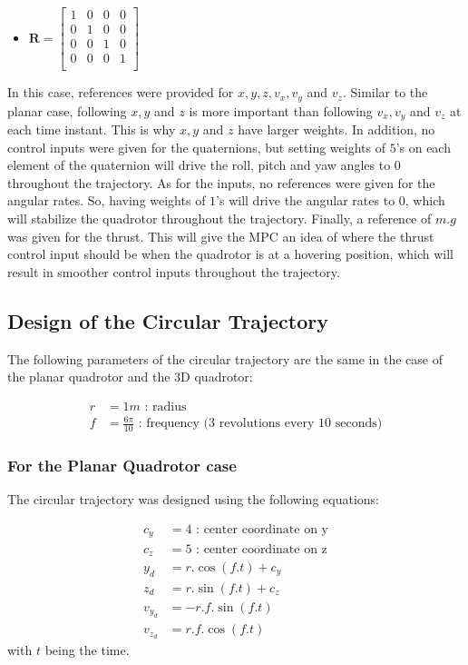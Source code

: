 \documentclass{thesisreport}
\begin{document}
\begin{multicols}{2}
\begin{itemize}
	\item $\bm{R} = \begin{bmatrix}
	1 & 0 & 0 & 0 \\
	0 & 1 & 0 & 0 \\
	0 & 0 & 1 & 0 \\
	0 & 0 & 0 & 1 \\
	\end{bmatrix}$
\end{itemize}
\end{multicols}

In this case, references were provided for $x,y,z,v_x,v_y$ and $v_z$. Similar to the planar case, following $x,y$ and $z$ is more important than following $v_x,v_y$ and $v_z$ at each time instant. This is why $x,y$ and $z$ have larger weights. In addition, no control inputs were given for the quaternions, but setting weights of $5$'s on each element of the quaternion will drive the roll, pitch and yaw angles to 0 throughout the trajectory. As for the inputs, no references were given for the angular rates. So, having weights of $1$'s will drive the angular rates to 0, which will stabilize the quadrotor throughout the trajectory. Finally, a reference of $m.g$ was given for the thrust. This will give the MPC an idea of where the thrust control input should be when the quadrotor is at a hovering position, which will result in smoother control inputs throughout the trajectory.

\newpage

\subsection{Design of the Circular Trajectory}

The following parameters of the circular trajectory are the same in the case of the planar quadrotor and the 3D quadrotor:

\begin{align*}
	r &= 1m \text{ : radius}  \\
	f &= \frac{6 \pi}{10} \text{ : frequency (3 revolutions every 10 seconds)}
\end{align*}

\subsubsection{For the Planar Quadrotor case}

The circular trajectory was designed using the following equations:

\begin{align*}
	c_y &= 4 \text{ : center coordinate on y}\\
	c_z &= 5 \text{ : center coordinate on z}\\
	y_d &= r.\cos(f.t) + c_y \\
	z_d &= r.\sin(f.t) + c_z \\
	v_{y_d} &= -r.f.\sin(f.t) \\ 
	v_{z_d} &=  r.f.\cos(f.t)
\end{align*}
with $t$ being the time.
\end{document}
